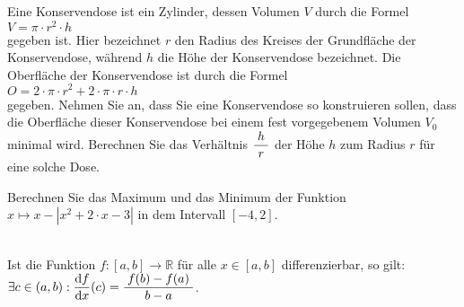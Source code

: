 \exercise
Eine Konservendose ist ein Zylinder, dessen Volumen $V$ durch die Formel
\\[0.2cm]
\hspace*{1.3cm}
$V = \pi \cdot r^2 \cdot h$
\\[0.2cm]
gegeben ist.  Hier bezeichnet $r$ den Radius des Kreises der Grundfl\"ache der Konservendose, w\"ahrend
$h$ die H\"ohe der Konservendose bezeichnet.  Die Oberfl\"ache der Konservendose ist durch die Formel
\\[0.2cm]
\hspace*{1.3cm}
$O = 2 \cdot \pi \cdot r^2 + 2 \cdot \pi \cdot r \cdot h$
\\[0.2cm]
gegeben.  Nehmen Sie an, dass Sie eine Konservendose so konstruieren sollen, dass die Oberfl\"ache
dieser Konservendose bei einem fest vorgegebenem Volumen $V_0$  minimal wird.  Berechnen Sie das
Verh\"altnis $\displaystyle\frac{\;h\;}{r}$ der H\"ohe $h$ zum Radius $r$ f\"ur eine solche Dose.  \eox

\exercise
Berechnen Sie das Maximum und das Minimum der Funktion $x \mapsto x - |x^2 + 2 \cdot x - 3|$ in dem Intervall $[-4,2]$.  \eox

\begin{Satz}
  \hspace*{\fill} \\
  Ist die Funktion $f:[a,b] \rightarrow \mathbb{R}$ f\"ur alle $x\in[a,b]$ differenzierbar, 
  so gilt: 
  \\[0.3cm]
  \hspace*{1.3cm}
  $\exists c \in (a,b): \displaystyle\frac{\textrm{d}f}{\textrm{d}x}(c) = \displaystyle\frac{\;\displaystyle f(b) - f(a)\;}{\;\displaystyle b - a\;}$.
\end{Satz}

